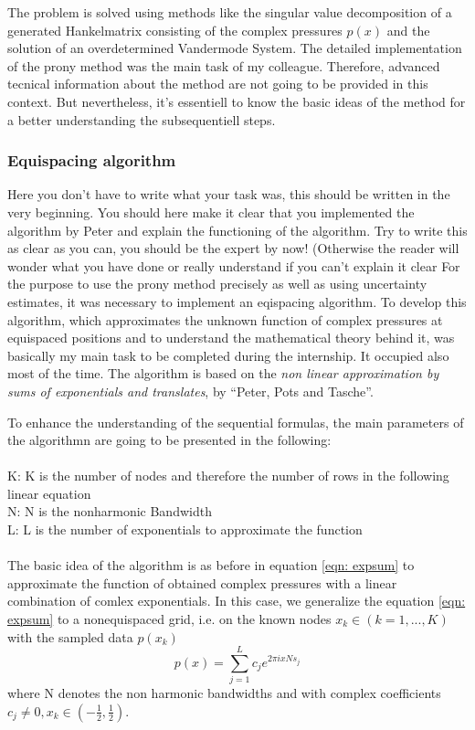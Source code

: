\documentclass{article}
\begin{document}
The problem is solved using methods like the singular value decomposition of a generated Hankelmatrix consisting of the complex pressures $p(x)$ and the solution of an overdetermined Vandermode System.
The detailed implementation of the prony method was the main task of my colleague.
Therefore, advanced tecnical information about the method are not going to be provided in this context.
But nevertheless, it's essentiell to know the basic ideas of the method for a better understanding the subsequentiell steps. 


\subsubsection{Equispacing algorithm}
{\color{red} Here you don't have to write what your task was, this should be written in the very beginning. You should here make it clear that you implemented the algorithm by Peter and explain the functioning of the algorithm. Try to write this as clear as you can, you should be the expert by now! (Otherwise the reader will wonder what you have done or really understand if you can't explain it clear}
For the purpose to use the prony method precisely as well as using uncertainty estimates, it was necessary to implement an eqispacing algorithm. 
To develop this algorithm, which approximates the unknown function of complex pressures at equispaced positions and to understand the mathematical theory behind it, was basically my main task to be completed during the internship.
It occupied also most of the time.
The algorithm is based on the \textit{non linear approximation by sums of exponentials and translates}, by “Peter, Pots and Tasche”. \cite{Peter2011} 

To enhance the understanding of the sequential formulas, the main parameters of the algorithmn are going to be presented in the following:
\\\\
 K: K is the number of nodes and therefore the number of rows in the following linear equation\\
 N: N is the nonharmonic Bandwidth\\
 L: L is the number of exponentials to approximate the function
\\\\
The basic idea of the algorithm is as before in equation \eqref{eqn: expsum} to approximate the function of obtained complex pressures with a linear combination of comlex exponentials.
In this case, we generalize the equation \eqref{eqn: expsum} to a nonequispaced grid, i.e. on the known nodes $x_{k}\in (k=1,...,K)$ with the sampled data  $p(x_{k}) $
\\
\begin{equation}
 p(x)=\sum\limits_{j=1}^L c_{j}e^{2\pi ixNs_{j}}
\end{equation}
where N denotes the non harmonic bandwidths and with complex coefficients $c_{j}\neq0, x_{k} \in (-\frac{1}{2},\frac{1}{2})$.
\end{document}
